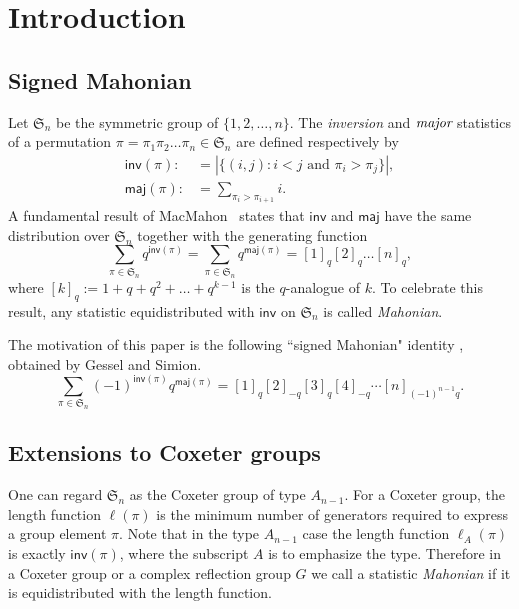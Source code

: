 \documentclass[a4paper, reqno, 11pt]{amsart}
\newcommand{\maj}{{\textsf{maj}}}
\newcommand{\inv}{{\textsf{inv}}}
\numberwithin{equation}{section}
\begin{document}
\section{Introduction}\label{sec:intro}


\subsection{Signed Mahonian}

Let $\mathfrak{S}_n$ be the symmetric group of $\{1,2,\dots , n\}$. The
\emph{inversion} and $\emph{major}$ statistics of a permutation $\pi
= \pi_1\pi_2\dots \pi_n \in \mathfrak{S}_n$ are defined respectively by
\begin{align*}
\inv(\pi):&=| \{(i,j): i<j \mbox{ and } \pi_i>\pi_j \}|,\\
\maj(\pi):&= \sum_{\pi_i>\pi_{i+1}} i .
\end{align*}
A fundamental result of MacMahon~\cite{MacMahon_13} states that
$\inv$ and $\maj$ have the same distribution over $\mathfrak{S}_n$ together
with the generating function
\begin{equation}\label{eq:A_Poincare}
\sum_{\pi\in \mathfrak{S}_n}q^{\inv(\pi)}= \sum_{\pi\in \mathfrak{S}_n}q^{\maj(\pi)}=[1]_q[2]_q\dots [n]_q,
\end{equation}
where $[k]_q:=1+q+q^2+\dots +q^{k-1}$ is the $q$-analogue of $k$. To
celebrate this result, any statistic equidistributed with $\inv$ on
$\mathfrak{S}_n$ is called \emph{Mahonian}.

The motivation of this paper is the following ``signed Mahonian" identity \cite{Wachs_92}, obtained by Gessel and Simion.
\begin{equation} \label{eq:A_signMaho}
\sum_{\pi\in \mathfrak{S}_n}(-1)^{\inv(\pi)}q^{\maj(\pi)} = [1]_q[2]_{-q}[3]_q[4]_{-q}\cdots [n]_{(-1)^{n-1} q}.
\end{equation}



\subsection{Extensions to Coxeter groups}
One can regard $\mathfrak{S}_n$ as the Coxeter group of type $A_{n-1}$. 
For a Coxeter group, the length function $\ell(\pi)$ is the minimum number of generators required to express a group element $\pi$. 
Note that in the type $A_{n-1}$ case the length function $\ell_A(\pi)$ is exactly $\inv(\pi)$, where the subscript $A$ is to emphasize the type.
Therefore in a Coxeter group or a complex reflection group $G$ we call a statistic \emph{Mahonian} if it is equidistributed with the length function.
\end{document}
